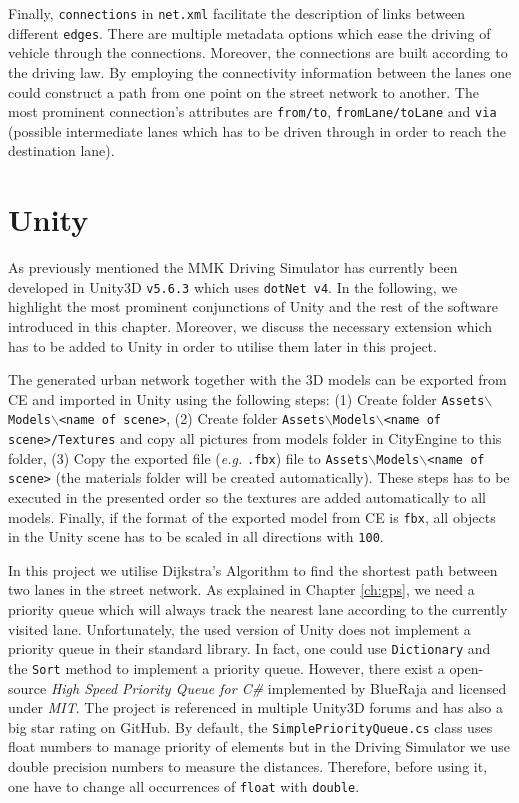 Finally, \texttt{connections} in \texttt{net.xml} facilitate the description of links between different \texttt{edges}. There are multiple metadata options which ease the driving of vehicle through the connections. Moreover, the connections are built according to the driving law. By employing the connectivity information between the lanes one could construct a path from one point on the street network to another. The most prominent connection's attributes are \texttt{from/to}, \texttt{fromLane/toLane} and \texttt{via} (possible intermediate lanes which has to be driven through in order to reach the destination lane). 

\section{Unity}
\label{ch:unity}
As previously mentioned the MMK Driving Simulator has currently been developed  in Unity3D \texttt{v5.6.3} which uses \texttt{dotNet v4}. In the following, we highlight the most prominent conjunctions of Unity and the rest of the software introduced in this chapter. Moreover, we discuss the necessary extension which has to be added to Unity in order to utilise them later in this project.

The generated urban network together with the 3D models can be exported from CE and imported in Unity using the following steps: (1) Create folder \texttt{Assets$\backslash$Models$\backslash$<name of scene>}, (2) Create folder \texttt{Assets$\backslash$Models$\backslash$<name of scene>/Textures} and copy all pictures from models folder in CityEngine to this folder, (3) Copy the exported file (\emph{e.g.} \texttt{.fbx}) file to \texttt{Assets$\backslash$Models$\backslash$<name of scene>} (the materials folder will be created automatically). These steps has to be executed in the presented order so the textures are added automatically to all models. Finally, if the format of the exported model from CE is \texttt{fbx}, all objects in the Unity scene has to be scaled in all directions with \texttt{100}.

In this project we utilise Dijkstra's Algorithm to find the shortest path between two lanes in the street network. As explained in Chapter \ref{ch:gps}, we need a priority queue which will always track the nearest lane according to the currently visited lane. Unfortunately, the used version of Unity does not implement a priority queue in their standard library. In fact, one could use \texttt{Dictionary} and the \texttt{Sort} method to implement a priority queue. However, there exist a open-source \emph{High Speed Priority Queue for C\#} implemented by BlueRaja and licensed under \emph{MIT}. The project is referenced in multiple Unity3D forums and has also a big star rating on GitHub. By default, the \texttt{SimplePriorityQueue.cs} class uses float numbers to manage priority of elements but in the Driving Simulator we use double precision numbers to measure the distances. Therefore, before using it, one have to change all occurrences of \texttt{float} with \texttt{double}.

